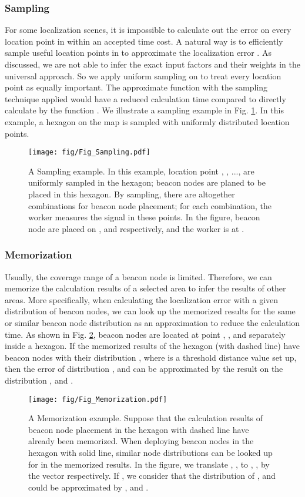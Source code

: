 \documentclass[10pt, conference, letterpaper]{IEEEtran}
\begin{document}
\subsubsection{Sampling}
For some localization scenes, it is impossible to calculate out the error on every location point in  within an accepted time cost. A natural way is to efficiently sample useful location points in  to approximate the localization error . As discussed, we are not able to infer the exact input factors and their weights in the universal approach. So we apply uniform sampling on  to treat every location point as equally important. The approximate function  with the sampling technique applied would have a reduced calculation time compared to directly calculate  by the function . We illustrate a sampling example in Fig. \ref{Fig_Sampling}. In this example, a hexagon on the map is sampled with uniformly distributed location points.
\begin{figure}
\centering
\texttt{[image: fig/Fig\_Sampling.pdf]}\\
\caption{\textrm{A Sampling example. In this example, location point , , ...,  are uniformly sampled in the hexagon;  beacon nodes are planed to be placed in this hexagon. By sampling, there are altogether  combinations for beacon node placement; for each combination, the worker measures the signal in these  points. In the figure,  beacon node are placed on ,  and  respectively, and the worker is at .}} \label{Fig_Sampling}
\end{figure}
\subsubsection{Memorization} \label{memorization}
Usually, the coverage range of a beacon node is limited. Therefore, we can memorize the calculation results of a selected area to infer the results of other areas. More specifically, when calculating the localization error with a given distribution of beacon nodes, we can look up the memorized results for the same or similar beacon node distribution as an approximation to reduce the calculation time. As shown in Fig. \ref{Fig_Memorization},  beacon nodes are located at point , , and  separately inside a hexagon. If the memorized results of the hexagon (with dashed line) have  beacon nodes with their distribution , where  is a threshold distance value set up, then the error of distribution ,  and  can be approximated by the result on the distribution ,  and .
\begin{figure}
\centering
\texttt{[image: fig/Fig\_Memorization.pdf]}\\
\caption{\textrm{A Memorization example. Suppose that the calculation results of beacon node placement in the hexagon with dashed line have already been memorized. When deploying beacon nodes in the hexagon with solid line, similar node distributions can be looked up for in the memorized results. In the figure, we translate , ,  to , ,  by the vector  respectively. If , we consider that the distribution of ,  and  could be approximated by ,  and .}}
\label{Fig_Memorization}
\end{figure}
\end{document}

